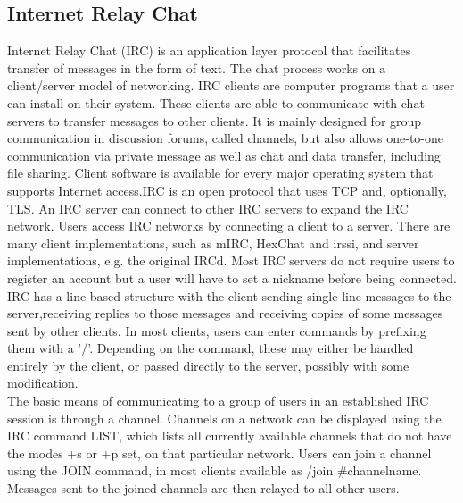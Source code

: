 \subsection{Internet Relay Chat}
Internet Relay Chat (IRC) is an application layer protocol that facilitates transfer of messages in the form of text. The chat process works on a client/server model of networking. IRC clients are computer programs that a user can install on their system. These clients are able to communicate with chat servers to transfer messages to other clients. It is mainly designed for group communication in discussion forums, called channels, but also allows one-to-one communication via private message as well as chat and data transfer, including file sharing.
Client software is available for every major operating system that supports Internet access.IRC is an open protocol that uses TCP and, optionally, TLS. An IRC server can connect to other IRC servers to expand the IRC network. Users access IRC networks by connecting a client to a server. There are many client implementations, such as mIRC, HexChat and irssi, and server implementations, e.g. the original IRCd. Most IRC servers do not require users to register an account but a user will have to set a nickname before being connected.\\

IRC has a line-based structure with the client sending single-line messages to the server,receiving replies to those messages and receiving copies of some messages sent by other clients. In most clients, users can enter commands by prefixing them with a '/'. Depending on the command, these may either be handled entirely by the client, or  passed directly to the server, possibly with some modification.\\

The basic means of communicating to a group of users in an established IRC session is through a channel. Channels on a network can be displayed using the IRC command LIST, which lists all currently available channels that do not have the modes +s or +p set, on that particular network.
Users can join a channel using the JOIN command, in most clients available as /join \#channelname. Messages sent to the joined channels are then relayed to all other users.\\